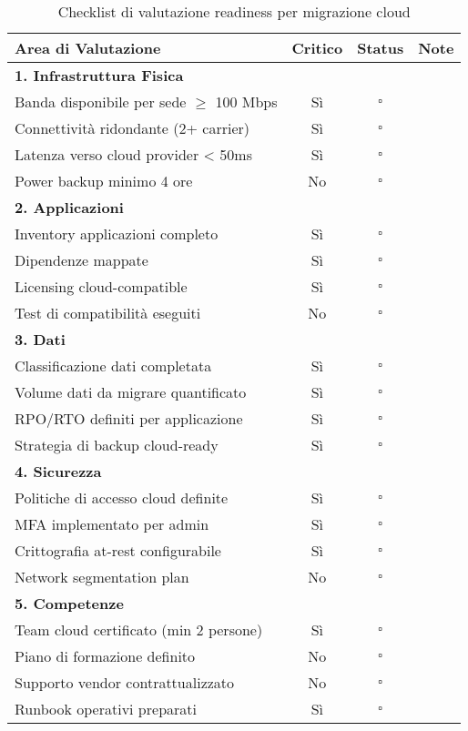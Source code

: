 \begin{table}[htbp]
\centering
\caption{Checklist di valutazione readiness per migrazione cloud}
\begin{tabular}{|p{6cm}|c|c|p{4cm}|}
\hline
\textbf{Area di Valutazione} & \textbf{Critico} & \textbf{Status} & \textbf{Note} \\
\hline
\multicolumn{4}{|l|}{\textbf{1. Infrastruttura Fisica}} \\
\hline
Banda disponibile per sede $\geq$ 100 Mbps & Sì & $\square$ & \\
\hline
Connettività ridondante (2+ carrier) & Sì & $\square$ & \\
\hline
Latenza verso cloud provider < 50ms & Sì & $\square$ & \\
\hline
Power backup minimo 4 ore & No & $\square$ & \\
\hline
\multicolumn{4}{|l|}{\textbf{2. Applicazioni}} \\
\hline
Inventory applicazioni completo & Sì & $\square$ & \\
\hline
Dipendenze mappate & Sì & $\square$ & \\
\hline
Licensing cloud-compatible & Sì & $\square$ & \\
\hline
Test di compatibilità eseguiti & No & $\square$ & \\
\hline
\multicolumn{4}{|l|}{\textbf{3. Dati}} \\
\hline
Classificazione dati completata & Sì & $\square$ & \\
\hline
Volume dati da migrare quantificato & Sì & $\square$ & \\
\hline
RPO/RTO definiti per applicazione & Sì & $\square$ & \\
\hline
Strategia di backup cloud-ready & Sì & $\square$ & \\
\hline
\multicolumn{4}{|l|}{\textbf{4. Sicurezza}} \\
\hline
Politiche di accesso cloud definite & Sì & $\square$ & \\
\hline
MFA implementato per admin & Sì & $\square$ & \\
\hline
Crittografia at-rest configurabile & Sì & $\square$ & \\
\hline
Network segmentation plan & No & $\square$ & \\
\hline
\multicolumn{4}{|l|}{\textbf{5. Competenze}} \\
\hline
Team cloud certificato (min 2 persone) & Sì & $\square$ & \\
\hline
Piano di formazione definito & No & $\square$ & \\
\hline
Supporto vendor contrattualizzato & No & $\square$ & \\
\hline
Runbook operativi preparati & Sì & $\square$ & \\
\hline
\end{tabular}
\end{table}

